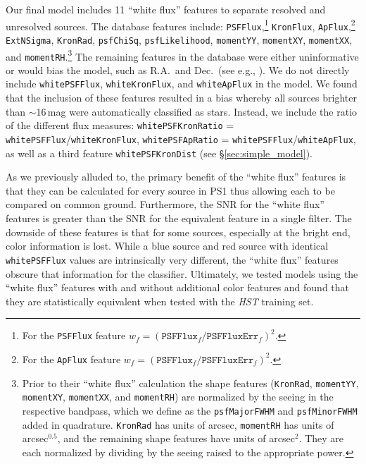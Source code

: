 \documentclass[twocolumn]{aastex62}
\begin{document}
\begin{CJK*}{UTF8}{gbsn}
Our final model includes 11 ``white flux'' features to separate resolved and unresolved sources. The database features include: \texttt{PSFFlux},\footnote{For the
\texttt{PSFFlux} feature $w_f =
(\mathtt{PSFFlux}_f/\mathtt{PSFFluxErr}_f)^2$.} \texttt{KronFlux},
\texttt{ApFlux},\footnote{For the \texttt{ApFlux} feature $w_f =
(\mathtt{PSFFlux}_f/\mathtt{PSFFluxErr}_f)^2$.} 
\texttt{ExtNSigma},
\texttt{KronRad}, \texttt{psfChiSq}, \texttt{psfLikelihood},
\texttt{momentYY}, \texttt{momentXY}, \texttt{momentXX}, and
\texttt{momentRH}.\footnote{Prior to their ``white flux'' calculation the
shape features (\texttt{KronRad}, \texttt{momentYY}, \texttt{momentXY},
\texttt{momentXX}, and \texttt{momentRH}) are normalized by the seeing in the
respective bandpass, which we define as the \texttt{psfMajorFWHM} and
\texttt{psfMinorFWHM} added in quadrature. \texttt{KronRad} has units of
arcsec, \texttt{momentRH} has units of arcsec$^{0.5}$, and the remaining
shape features have units of arcsec$^{2}$. They are each normalized by
dividing by the seeing raised to the appropriate power. } The remaining
features in the database were either uninformative or would bias the model,
such as R.A.\ and Dec.\ (see e.g., \citealt{Richards12a}). We do not directly
include \texttt{whitePSFFlux}, \texttt{whiteKronFlux}, and
\texttt{whiteApFlux} in the model. We found that the inclusion of these
features resulted in a bias whereby all sources brighter than $\sim$16\,mag
were automatically classified as stars. Instead, we include the ratio of the
different flux measures: \texttt{whitePSFKronRatio} =
\texttt{whitePSFFlux}/\texttt{whiteKronFlux}, \texttt{whitePSFApRatio} =
\texttt{whitePSFFlux}/\texttt{whiteApFlux}, as well as a third feature
\texttt{whitePSFKronDist} (see \S\ref{sec:simple_model}).

As we previously alluded to, the primary benefit of the ``white flux''
features is that they can be calculated for every source in PS1 thus
allowing each to be compared on common ground. Furthermore, the SNR for the
``white flux'' features is greater than the SNR for the equivalent feature
in a single filter. The downside of these features is that for some sources,
especially at the bright end, color information is lost. While a blue source
and red source with identical \texttt{whitePSFFlux} values are intrinsically
very different, the ``white flux'' features obscure that information for the
classifier. Ultimately, we tested models using the ``white flux'' features
with and without additional color features and found that they are
statistically equivalent when tested with the \textit{HST} training set.


\end{CJK*}
\end{document}

